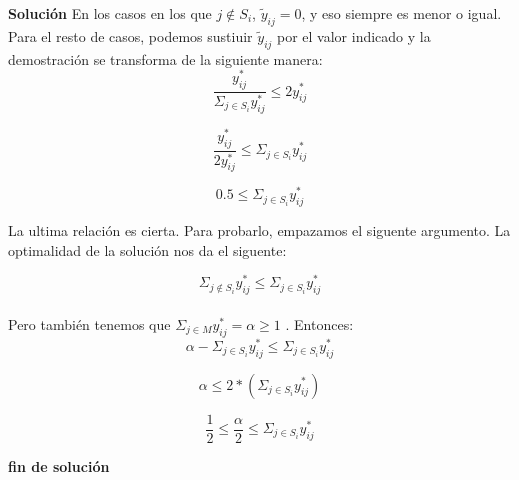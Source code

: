 \textbf{Solución}
En los casos en los que $j \notin S_i$, $\tilde{y}_{ij} = 0$, y eso siempre es menor o igual.
Para el resto de casos, podemos sustiuir $\tilde{y}_{ij}$ por el valor indicado y la demostración se transforma de la siguiente manera:
\begin{equation}
 \frac{y^*_{ij}}{\Sigma_{j \in S_i} y^*_{ij}} \leq 2y^*_{ij}
\end{equation}

\begin{equation}
 \frac{y^*_{ij}}{2y^*_{ij}} \leq \Sigma_{j \in S_i} y^*_{ij}
\end{equation}

\begin{equation}
 0.5 \leq \Sigma_{j \in S_i} y^*_{ij}
\end{equation}

La ultima relación es cierta. Para probarlo, empazamos el siguente argumento. La optimalidad de la solución nos da el siguente: 

\begin{equation}
 \Sigma_{j \notin S_i} y^*_{ij} \leq \Sigma_{j \in S_i} y^*_{ij}
\end{equation}
\\
Pero también tenemos que $\Sigma_{j \in M} y^*_{ij} = \alpha \geq 1 $ . Entonces:
\\
\begin{equation}
 \alpha - \Sigma_{j \in S_i} y^*_{ij} \leq \Sigma_{j \in S_i} y^*_{ij}
\end{equation}

\begin{equation}
 \alpha  \leq 2 * (\Sigma_{j \in S_i} y^*_{ij})
\end{equation}

\begin{equation}
 \frac{1}{2} \leq \frac{\alpha}{2} \leq \Sigma_{j \in S_i} y^*_{ij}
\end{equation}


\textbf{fin de solución}
